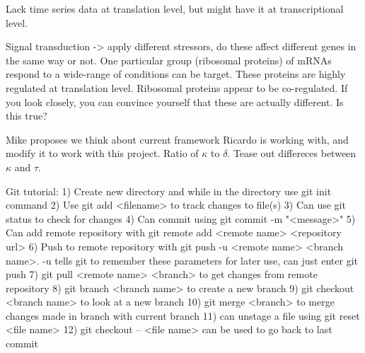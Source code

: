 \documentclass[11pt]{labbook}
\begin{document}
Lack time series data at translation level, but might have it at transcriptional level. 

Signal transduction -> apply different stressors, do these affect different genes in the same way or not. One particular group (ribosomal proteins) of mRNAs respond to a wide-range of conditions can be target. These proteins are highly regulated at translation level. Ribosomal proteins appear to be co-regulated. If you look closely, you can convince yourself that these are actually different. Is this true? 

Mike proposes we think about current framework Ricardo is working with, and modify it to work with this project. Ratio of $\kappa$ to $\delta$. Tease out differeces between $\kappa$ and $\tau$. 



Git tutorial:
1) Create new directory and while in the directory use git init command
2) Use git add <filename> to track changes to file(s)
3) Can use git status to check for changes
4) Can commit using git commit -m "<message>"
5) Can add remote repository with git remote add <remote name> <repository url>
6) Push to remote repository with git push -u <remote name> <branch name>. 
-u tells git to remember these parameters for later use, can just enter git push
7) git pull <remote name> <branch> to get changes from remote repository
8) git branch <branch name> to create a new branch
9) git checkout <branch name> to look at a new branch 
10) git merge <branch> to merge changes made in branch with current branch
11) can unstage a file using git reset <file name>
12) git checkout -- <file name> can be used to go back to last commit
\end{document}
